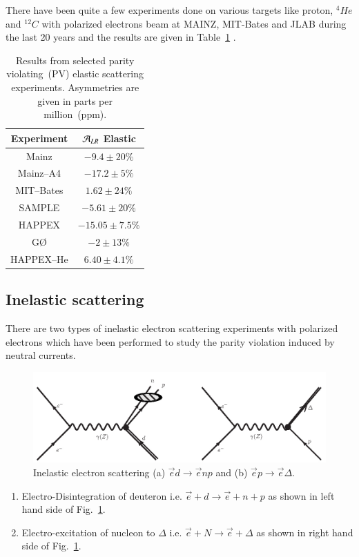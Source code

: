 There have been quite a few experiments done on various targets like proton, $^4{He}$ and $^{12}{C}$ with polarized electrons beam at MAINZ, MIT-Bates and JLAB during the last 20 years and the results are given in Table~\ref{chap9-tab2} \cite{chap9-key22}.
\bigskip

\begin{table}[H]
\centering
\renewcommand{\arraystretch}{1.15}
\begin{tabular}{|c|c|}
\hline
Experiment  & ${\cal A}_{LR}$ Elastic\\ 
\hline
Mainz& $-9.4\pm20\%$ \\ 
\hline
Mainz--A4&$-17.2\pm 5\%$ \\
\hline
MIT--Bates& $1.62\pm 24\%$\\
\hline
SAMPLE& $-5.61\pm 20\%$ \\
\hline
HAPPEX& $-15.05\pm 7.5\%$\\ 
\hline
G\O &$-2\pm13\%$ \\ 
\hline 
HAPPEX--He& $6.40\pm4.1\%$\\ 
\hline
\end{tabular}
\caption{Results from selected parity violating~(PV) elastic scattering experiments. Asymmetries are given in parts per million~(ppm).}
\label{chap9-tab2}
\end{table}


\subsection{Inelastic scattering}\label{chap9-subsec3.2}

There are two types of inelastic electron scattering experiments with polarized electrons which have been performed to study the parity violation induced by neutral currents.
\begin{figure}[t]
\centering
\includegraphics[scale=0.4]{src/images/chap9/fig2.jpg}
\caption{Inelastic electron scattering (a) $\vec{e}d\rightarrow\vec{e}np$ and (b) $\vec{e}p\rightarrow \vec{e}\Delta$.}\label{chap9-fig3}
\end{figure}
\begin{enumerate}
    \item Electro-Disintegration of deuteron i.e. $\vec{e}+d \rightarrow \vec{e}+n+p$ as shown in left hand side of Fig.~\ref{chap9-fig3}. 
    \item Electro-excitation of nucleon to $\Delta$ i.e. $\vec{e}+N \rightarrow \vec{e}+\Delta$ as shown in right hand side of Fig.~\ref{chap9-fig3}.  
\end{enumerate}   

